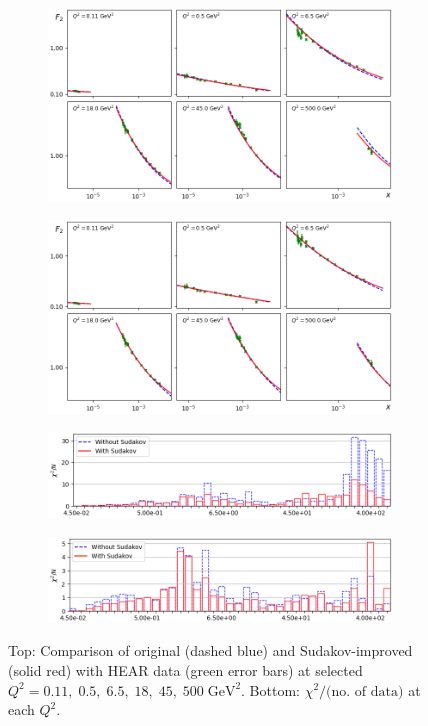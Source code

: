 \documentclass{appolb}
\begin{document}
\begin{figure}[t]
	\centering
	\begin{subfigure}{0.49\textwidth}
		\includegraphics[width=\textwidth]{./F2-data-GBW-lim1.png}
	\end{subfigure}
	\begin{subfigure}{0.49\textwidth}
		\includegraphics[width=\textwidth]{./F2-data-BGK-lim1.png}
	\end{subfigure}
	\begin{subfigure}{0.45\textwidth}
		\includegraphics[width=\textwidth]{./F2-data-GBWhist.png}
	\end{subfigure}
	\begin{subfigure}{0.45\textwidth}
		\includegraphics[width=\textwidth]{./F2-data-BGKhist.png}
	\end{subfigure}
	\caption{Top: Comparison of original (dashed blue) and Sudakov-improved (solid red) with  HEAR data (green error bars) at selected $Q^2=0.11,\;0.5,\;6.5,\;18,\;45,\;500\;\mathrm{GeV^2}$. Bottom: $\chi^2/\text{(no. of data)}$ at each $Q^2$.}
	\label{fig:grid}
\end{figure}
\end{document}
